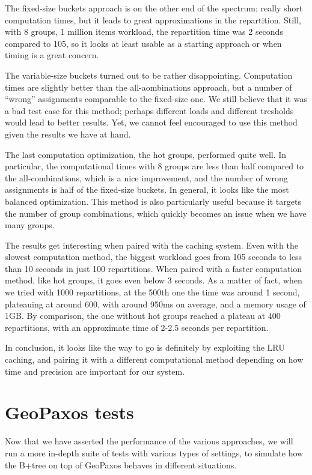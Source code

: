 The fixed-size buckets approach is on the other end of the spectrum; really short computation times, but it leads to great approximations in the repartition. Still, with 8 groups, 1 million items workload, the repartition time was 2 seconds compared to 105, so it looks at least usable as a starting approach or when timing is a great concern.

The variable-size buckets turned out to be rather disappointing. Computation times are slightly better than the all-aombinations approach, but a number of ``wrong'' assignments comparable to the fixed-size one. We still believe that it was a bad test case for this method; perhaps different loads and different tresholds would lead to better results. Yet, we cannot feel encouraged to use this method given the results we have at hand.

The last computation optimization, the hot groups, performed quite well. In particular, the computational times with 8 groups are less than half compared to the all-combinations, which is a nice improvement, and the number of wrong assignments is half of the fixed-size buckets. In general, it looks like the most balanced optimization. This method is also particularly useful because it targets the number of group combinations, which quickly becomes an issue when we have many groups.

The results get interesting when paired with the caching system. Even with the slowest computation method, the biggest workload goes from 105 seconds to less than 10 seconds in just 100 repartitions. When paired with a faster computation method, like hot groups, it goes even below 3 seconds. As a matter of fact, when we tried with 1000 repartitions, at the 500th one the time was around 1 second, plateauing at around 600, with around 950ms on average, and a memory usage of 1GB.
By comparison, the one without hot groups reached a plateau at 400 repartitions, with an approximate time of 2-2.5 seconds per repartition.

In conclusion, it looks like the way to go is definitely by exploiting the LRU caching, and pairing it with a different computational method depending on how time and precision are important for our system.

\chapter{GeoPaxos tests}\label{sec:geopaxos-tests}
Now that we have asserted the performance of the various approaches, we will run a more in-depth suite of tests with various types of settings, to simulate how the B+tree on top of GeoPaxos behaves in different situations.
